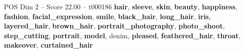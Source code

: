 \begin{textsample}{POS Dim 2 – Score 22.00 – t000186}  \label{ex:f2_pos_017}
\textbf{hair}, \textbf{sleeve}, \textbf{skin}, \textbf{beauty}, \textbf{happiness}, \textbf{fashion}, \textbf{facial\_expression}, \textbf{smile}, \textbf{black\_hair}, \textbf{long\_hair}, \textbf{iris}, \textbf{layered\_hair}, \textbf{brown\_hair}, \textbf{portrait\_photography}, \textbf{photo\_shoot}, \textbf{step\_cutting}, \textbf{portrait}, \textbf{model}, denim, \textbf{pleased}, \textbf{feathered\_hair}, \textbf{throat}, \textbf{makeover}, \textbf{curtained\_hair}

\end{textsample}
